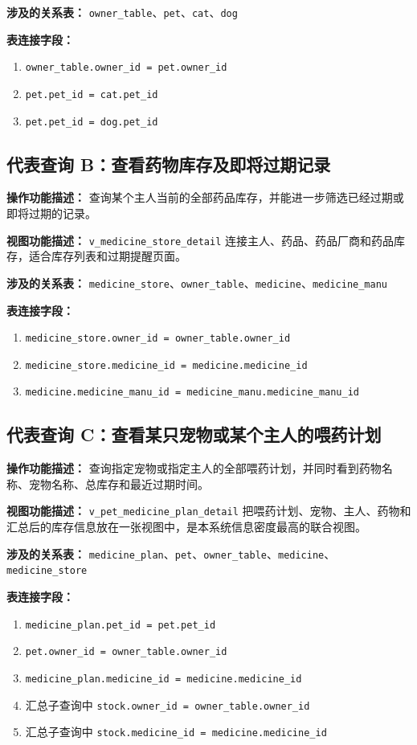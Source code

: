 \documentclass[12pt,a4paper,fontset=none]{ctexart}
\begin{document}
\textbf{涉及的关系表：} \texttt{owner\_table}、\texttt{pet}、\texttt{cat}、\texttt{dog}

\textbf{表连接字段：}
\begin{enumerate}
    \item \texttt{owner\_table.owner\_id = pet.owner\_id}
    \item \texttt{pet.pet\_id = cat.pet\_id}
    \item \texttt{pet.pet\_id = dog.pet\_id}
\end{enumerate}

\subsection{代表查询 B：查看药物库存及即将过期记录}
\textbf{操作功能描述：} 查询某个主人当前的全部药品库存，并能进一步筛选已经过期或即将过期的记录。

\textbf{视图功能描述：} \texttt{v\_medicine\_store\_detail} 连接主人、药品、药品厂商和药品库存，适合库存列表和过期提醒页面。

\textbf{涉及的关系表：} \texttt{medicine\_store}、\texttt{owner\_table}、\texttt{medicine}、\texttt{medicine\_manu}

\textbf{表连接字段：}
\begin{enumerate}
    \item \texttt{medicine\_store.owner\_id = owner\_table.owner\_id}
    \item \texttt{medicine\_store.medicine\_id = medicine.medicine\_id}
    \item \texttt{medicine.medicine\_manu\_id = medicine\_manu.medicine\_manu\_id}
\end{enumerate}

\subsection{代表查询 C：查看某只宠物或某个主人的喂药计划}
\textbf{操作功能描述：} 查询指定宠物或指定主人的全部喂药计划，并同时看到药物名称、宠物名称、总库存和最近过期时间。

\textbf{视图功能描述：} \texttt{v\_pet\_medicine\_plan\_detail} 把喂药计划、宠物、主人、药物和汇总后的库存信息放在一张视图中，是本系统信息密度最高的联合视图。

\textbf{涉及的关系表：} \texttt{medicine\_plan}、\texttt{pet}、\texttt{owner\_table}、\texttt{medicine}、\texttt{medicine\_store}

\textbf{表连接字段：}
\begin{enumerate}
    \item \texttt{medicine\_plan.pet\_id = pet.pet\_id}
    \item \texttt{pet.owner\_id = owner\_table.owner\_id}
    \item \texttt{medicine\_plan.medicine\_id = medicine.medicine\_id}
    \item 汇总子查询中 \texttt{stock.owner\_id = owner\_table.owner\_id}
    \item 汇总子查询中 \texttt{stock.medicine\_id = medicine.medicine\_id}
\end{enumerate}
\end{document}
